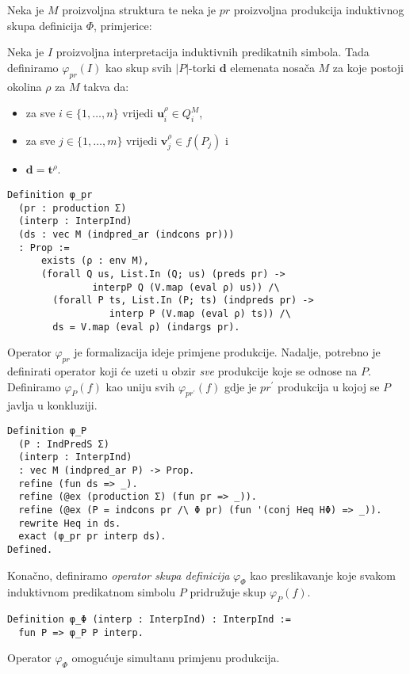 \begin{definition}
  Neka je \(M\) proizvoljna struktura te neka je \(pr\) proizvoljna produkcija induktivnog skupa definicija \(\Phi\), primjerice:
  \begin{prooftree}
\end{prooftree}
\noindent Neka je \(I\) proizvoljna interpretacija induktivnih predikatnih simbola.
Tada definiramo \(\varphi_{pr}(I)\) kao skup svih \(|P|\)-torki \(\mathbf{d}\) elemenata nosača \(M\) za koje postoji okolina \(\rho\) za \(M\) takva da:
\begin{itemize}
\item za sve \( i \in \{ 1, \ldots, n \} \) vrijedi \( \mathbf{u}_{i}^{\rho} \in Q_{i}^{M} \),
\item za sve \( j \in \{ 1, \ldots, m \} \) vrijedi \( \mathbf{v}_{j}^{\rho} \in f(P_{j}) \) i
\item \(\mathbf{d} = \mathbf{t}^{\rho}\).
\end{itemize}
\begin{verbatim}
Definition φ_pr
  (pr : production Σ)
  (interp : InterpInd)
  (ds : vec M (indpred_ar (indcons pr)))
  : Prop :=
      exists (ρ : env M),
      (forall Q us, List.In (Q; us) (preds pr) ->
               interpP Q (V.map (eval ρ) us)) /\
        (forall P ts, List.In (P; ts) (indpreds pr) ->
                  interp P (V.map (eval ρ) ts)) /\
        ds = V.map (eval ρ) (indargs pr).
\end{verbatim}
\noindent Operator \(\varphi_{pr}\) je formalizacija ideje primjene produkcije.
Nadalje, potrebno je definirati operator koji će uzeti u obzir \textit{sve} produkcije koje se odnose na \(P\).
Definiramo \(\varphi_{P}(f)\) kao uniju svih \(\varphi_{pr^{\prime}}(f)\)
gdje je \(pr^{\prime}\) produkcija u kojoj se \(P\) javlja u konkluziji.
\begin{verbatim}
Definition φ_P
  (P : IndPredS Σ)
  (interp : InterpInd)
  : vec M (indpred_ar P) -> Prop.
  refine (fun ds => _).
  refine (@ex (production Σ) (fun pr => _)).
  refine (@ex (P = indcons pr /\ Φ pr) (fun '(conj Heq HΦ) => _)).
  rewrite Heq in ds.
  exact (φ_pr pr interp ds).
Defined.
\end{verbatim}
\noindent Konačno, definiramo \textit{operator skupa definicija} \(\varphi_{\Phi}\) kao preslikavanje
koje svakom induktivnom predikatnom simbolu \(P\) pridružuje skup \(\varphi_{P}(f)\).
\begin{verbatim}
Definition φ_Φ (interp : InterpInd) : InterpInd :=
  fun P => φ_P P interp.
\end{verbatim}
\noindent Operator \(\varphi_{\Phi}\) omogućuje simultanu primjenu produkcija.
\end{definition}

